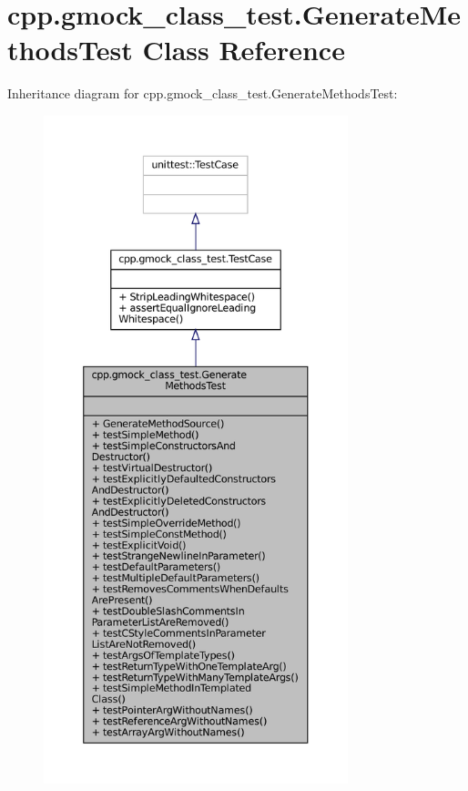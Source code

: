 \hypertarget{classcpp_1_1gmock__class__test_1_1GenerateMethodsTest}{}\section{cpp.\+gmock\+\_\+class\+\_\+test.\+Generate\+Methods\+Test Class Reference}
\label{classcpp_1_1gmock__class__test_1_1GenerateMethodsTest}


Inheritance diagram for cpp.\+gmock\+\_\+class\+\_\+test.\+Generate\+Methods\+Test\+:
\nopagebreak
\begin{figure}[H]
\begin{center}
\leavevmode
\includegraphics[height=550pt]{classcpp_1_1gmock__class__test_1_1GenerateMethodsTest__inherit__graph}
\end{center}
\end{figure}


